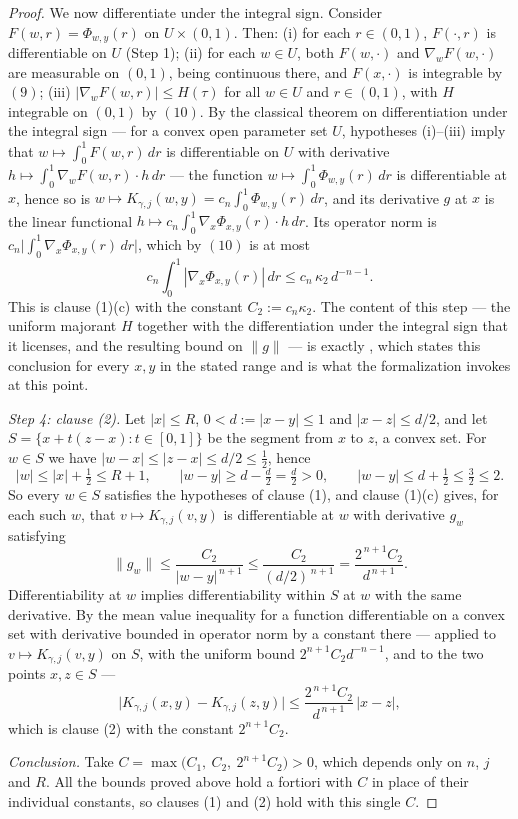 \begin{proof}
We now differentiate under the integral sign.  Consider
$F(w,r) = \Phi_{w,y}(r)$ on $U\times(0,1)$.  Then: (i) for each
$r \in (0,1)$, $F(\cdot,r)$ is differentiable on $U$ (Step 1); (ii) for each
$w \in U$, both $F(w,\cdot)$ and $\nabla_wF(w,\cdot)$ are measurable on
$(0,1)$, being continuous there, and $F(x,\cdot)$ is integrable by $(9)$; (iii) $|\nabla_wF(w,r)| \leq H(\tau)$ for
all $w \in U$ and $r \in (0,1)$, with $H$ integrable on $(0,1)$ by $(10)$.  By
the classical theorem on differentiation under the integral sign --- for a
convex open parameter set $U$, hypotheses (i)--(iii) imply that
$w \mapsto \int_0^1F(w,r)\,dr$ is differentiable on $U$ with derivative
$h \mapsto \int_0^1\nabla_wF(w,r)\cdot h\,dr$ --- the function
$w \mapsto \int_0^1\Phi_{w,y}(r)\,dr$ is differentiable at $x$, hence so is
$w \mapsto K_{\gamma,j}(w,y) = c_n\int_0^1\Phi_{w,y}(r)\,dr$, and its
derivative $g$ at $x$ is the linear functional
$h \mapsto c_n\int_0^1\nabla_x\Phi_{x,y}(r)\cdot h\,dr$.  Its operator norm is
$c_n\bigl|\int_0^1\nabla_x\Phi_{x,y}(r)\,dr\bigr|$, which by $(10)$ is at most
\[
  c_n\int_0^1|\nabla_x\Phi_{x,y}(r)|\,dr \leq c_n\,\kappa_2\,d^{-n-1} .
\]
This is clause (1)(c) with the constant $C_2 := c_n\kappa_2$.
The content of this step --- the uniform majorant $H$ together with the
differentiation under the integral sign that it licenses, and the resulting bound
on $\|g\|$ --- is exactly , which states
this conclusion for every $x,y$ in the stated range and is what the formalization
invokes at this point.

\emph{Step 4: clause (2).}
Let $|x| \leq R$, $0 < d := |x-y| \leq 1$ and $|x-z| \leq d/2$, and let
$S = \{x + t(z-x) : t \in [0,1]\}$ be the segment from $x$ to $z$, a convex
set.  For $w \in S$ we have $|w - x| \leq |z-x| \leq d/2 \leq \tfrac12$, hence
\[
  |w| \leq |x| + \tfrac12 \leq R + 1 ,
  \qquad
  |w-y| \geq d - \tfrac{d}{2} = \tfrac{d}{2} > 0 ,
  \qquad
  |w-y| \leq d + \tfrac12 \leq \tfrac32 \leq 2 .
\]
So every $w \in S$ satisfies the hypotheses of clause (1), and clause (1)(c)
gives, for each such $w$, that $v \mapsto K_{\gamma,j}(v,y)$ is differentiable
at $w$ with derivative $g_w$ satisfying
\[
  \|g_w\| \leq \frac{C_2}{|w-y|^{\,n+1}}
    \leq \frac{C_2}{(d/2)^{\,n+1}}
    = \frac{2^{\,n+1}C_2}{d^{\,n+1}} .
\]
Differentiability at $w$ implies differentiability within $S$ at $w$ with the
same derivative.  By the mean value inequality for a function differentiable on
a convex set with derivative bounded in operator norm by a constant there
--- applied to $v \mapsto K_{\gamma,j}(v,y)$ on $S$, with the uniform bound
$2^{n+1}C_2d^{-n-1}$, and to the two points $x,z \in S$ ---
\[
  \bigl|K_{\gamma,j}(x,y) - K_{\gamma,j}(z,y)\bigr|
    \leq \frac{2^{\,n+1}C_2}{d^{\,n+1}}\,|x-z| ,
\]
which is clause (2) with the constant $2^{n+1}C_2$.

\emph{Conclusion.}  Take
$C = \max\bigl(C_1,\ C_2,\ 2^{n+1}C_2\bigr) > 0$, which depends only on $n$,
$j$ and $R$.  All the bounds proved above hold a fortiori with $C$ in place of
their individual constants, so clauses (1) and (2) hold with this single $C$.
\end{proof}
